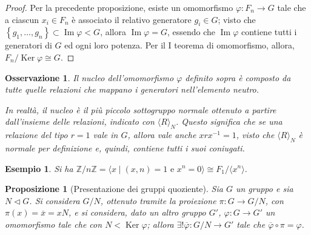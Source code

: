 \documentclass[12pt]{scrartcl}
\theoremstyle{style}
\newtheorem{esempio}{Esempio}[section]
\newtheorem{prop}{Proposizione}[section]
\newtheorem{osservazione}{Osservazione}[section]
\numberwithin{equation}{subsection}
\begin{document}
	\begin{proof}
		Per la precedente proposizione, esiste un omomorfismo $\varphi : F_n \to G$ tale che a ciascun $x_i \in F_n$ \`e associato il relativo generatore $g_i \in G$; visto che $\left\{ g_1,\ldots,g_n \right\} \subset \operatorname{Im} \varphi < G$, allora $\operatorname{Im} \varphi = G$, essendo che $\operatorname{Im} \varphi $ contiene tutti i generatori di $G$ ed ogni loro potenza.
		Per il I teorema di omomorfismo, allora, $F_n / \operatorname{Ker} \varphi \cong G$.
	\end{proof}
\begin{osservazione}
Il nucleo dell'omomorfismo $\varphi $ definito sopra \`e composto da tutte quelle relazioni che mappano i generatori nell'elemento neutro.

In realt\`a, il nucleo \`e il pi\`u piccolo sottogruppo normale ottenuto a partire dall'insieme delle relazioni, indicato con $\langle R \rangle_N$.
Questo significa che se una relazione del tipo $r = 1$ vale in $G$, allora vale anche $xrx^{-1}=1$, visto che $\langle R \rangle_N$ \`e normale per definizione e, quindi, contiene tutti i suoi coniugati.
\end{osservazione}
\begin{esempio}
Si ha $\mathbb{Z} / n\mathbb{Z} = \langle x  \mid (x,n) = 1 \text{ e } x^n = 0 \rangle\cong F_1 / \langle x^n \rangle$.
\end{esempio}
\begin{prop}
	[Presentazione dei gruppi quoziente]
	Sia $G$ un gruppo e sia $N \lhd G$. 
	Si considera $G / N$, ottenuto tramite la proiezione $\pi : G \to G / N$, con $\pi(x) = \overline{x}=x N$, e si considera, dato un altro gruppo $G'$, $\varphi :G \to G'$ un omomorfismo tale che con $N < \operatorname{Ker} \varphi $; allora $\exists ! \overline{\varphi }: G / N \to G '$ tale che $\overline{\varphi }\circ \pi = \varphi $.
\end{prop}
\end{document}
